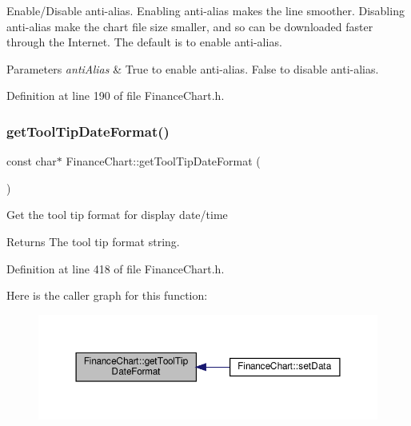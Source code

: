 Enable/\+Disable anti-\/alias. Enabling anti-\/alias makes the line smoother. Disabling anti-\/alias make the chart file size smaller, and so can be downloaded faster through the Internet. The default is to enable anti-\/alias. 


\begin{DoxyParams}{Parameters}
{\em anti\+Alias} & True to enable anti-\/alias. False to disable anti-\/alias.\\
\hline
\end{DoxyParams}


Definition at line 190 of file Finance\+Chart.\+h.

\mbox{\label{class_finance_chart_ad9bb91fe15acd6895f4586742db4e0b1}} 
\subsubsection{\texorpdfstring{get\+Tool\+Tip\+Date\+Format()}{getToolTipDateFormat()}}
{\footnotesize\ttfamily const char$\ast$ Finance\+Chart\+::get\+Tool\+Tip\+Date\+Format (\begin{DoxyParamCaption}{ }\end{DoxyParamCaption})\hspace{0.3cm}{\ttfamily [inline]}}



Get the tool tip format for display date/time 

\begin{DoxyReturn}{Returns}
The tool tip format string.
\end{DoxyReturn}


Definition at line 418 of file Finance\+Chart.\+h.

Here is the caller graph for this function\+:
\nopagebreak
\begin{figure}[H]
\begin{center}
\leavevmode
\includegraphics[width=350pt]{class_finance_chart_ad9bb91fe15acd6895f4586742db4e0b1_icgraph}
\end{center}
\end{figure}
\mbox{\label{class_finance_chart_a603fc3911e3fc85c69ff9340f85c3d85}} 
